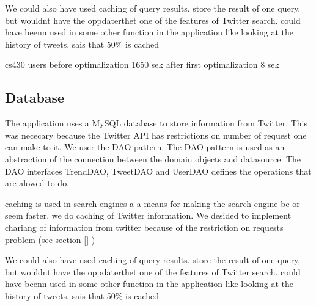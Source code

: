 We could also have used caching of query results. store the result of one query, but wouldnt have the oppdaterthet %
one of the features of Twitter search. could have beenn used in some other function in the application like looking at the history of tweets. \citet{boka kap 11, under caching} sais that 50\% is cached


cs430 users 
before optimalization
1650 sek
after first optimalization
8 sek

\subsection{Database} %
\label{feedJamDatabase}
The application uses a MySQL database to store information from Twitter. This was nececary because the Twitter API has restrictions on number of request one can make to it.
We user the DAO pattern. The DAO pattern is used as an abstraction of the connection between the domain objects and datasource. The DAO interfaces TrendDAO, TweetDAO and UserDAO defines the operations that are alowed to do.  


\citep{boka kap11} caching is used in search engines a a means for making the search engine be or seem faster. we do caching of Twitter information. We desided to implement chariang of information from twitter because of the restriction on requests problem (see section \ref{} \nameref{}) 

We could also have used caching of query results. store the result of one query, but wouldnt have the oppdaterthet %
one of the features of Twitter search. could have beenn used in some other function in the application like looking at the history of tweets. \citet{boka kap 11, under caching} sais that 50\% is cached




